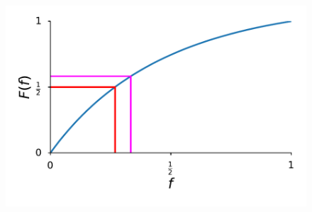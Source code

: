 \documentclass[11pt,a4paper]{article}
\begin{document}
\begin{figure}[!t]
 \vspace*{1\baselineskip}
\includegraphics[width=1\textwidth]{FractionPlot.pdf}
\caption{}
\label{FractionPlot}
\end{figure}



\end{document}
